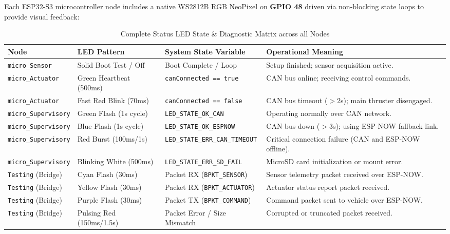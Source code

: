 \documentclass[11pt,a4paper]{article}
\begin{document}
Each ESP32-S3 microcontroller node includes a native WS2812B RGB NeoPixel on \textbf{GPIO 48} driven via non-blocking state loops to provide visual feedback:

\begin{table}[htbp]
\centering
\caption{Complete Status LED State \& Diagnostic Matrix across all Nodes}
\label{tab:led_matrix}
\begin{tabularx}{\textwidth}{l l l X}
\toprule
\textbf{Node} & \textbf{LED Pattern} & \textbf{System State Variable} & \textbf{Operational Meaning} \\
\midrule
\texttt{micro\_Sensor} & Solid Boot Test / Off & Boot Complete / Loop & Setup finished; sensor acquisition active. \\
\texttt{micro\_Actuator} & Green Heartbeat (500ms) & \texttt{canConnected == true} & CAN bus online; receiving control commands. \\
\texttt{micro\_Actuator} & Fast Red Blink (70ms) & \texttt{canConnected == false} & CAN bus timeout ($>2$s); main thruster disengaged. \\
\texttt{micro\_Supervisory} & Green Flash (1s cycle) & \texttt{LED\_STATE\_OK\_CAN} & Operating normally over CAN network. \\
\texttt{micro\_Supervisory} & Blue Flash (1s cycle) & \texttt{LED\_STATE\_OK\_ESPNOW} & CAN bus down ($>3$s); using ESP-NOW fallback link. \\
\texttt{micro\_Supervisory} & Red Burst (100ms/1s) & \texttt{LED\_STATE\_ERR\_CAN\_TIMEOUT} & Critical connection failure (CAN and ESP-NOW offline). \\
\texttt{micro\_Supervisory} & Blinking White (500ms) & \texttt{LED\_STATE\_ERR\_SD\_FAIL} & MicroSD card initialization or mount error. \\
\texttt{Testing} (Bridge) & Cyan Flash (30ms) & Packet RX (\texttt{BPKT\_SENSOR}) & Sensor telemetry packet received over ESP-NOW. \\
\texttt{Testing} (Bridge) & Yellow Flash (30ms) & Packet RX (\texttt{BPKT\_ACTUATOR}) & Actuator status report packet received. \\
\texttt{Testing} (Bridge) & Purple Flash (30ms) & Packet TX (\texttt{BPKT\_COMMAND}) & Command packet sent to vehicle over ESP-NOW. \\
\texttt{Testing} (Bridge) & Pulsing Red (150ms/1.5s) & Packet Error / Size Mismatch & Corrupted or truncated packet received. \\
\bottomrule
\end{tabularx}
\end{table}
\end{document}

